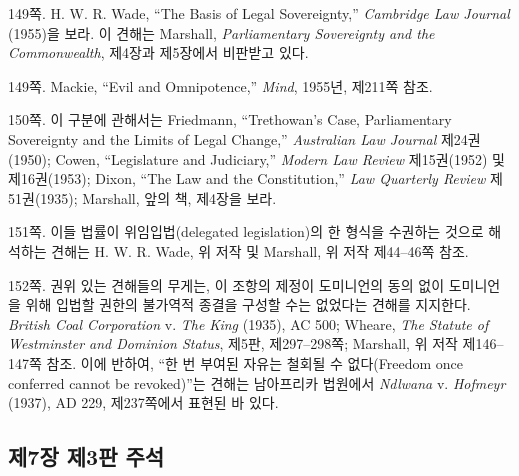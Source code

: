 {\noteentry 149쪽.  H. W. R. Wade, “The Basis of Legal
Sovereignty,” \emph{Cambridge Law Journal} (1955)을 보라. 이 견해는
Marshall, \emph{Parliamentary Sovereignty and the Commonwealth}, 제4장과
제5장에서 비판받고 있다.

\noteentry 149쪽.  Mackie, “Evil and Omnipotence,” \emph{Mind},
1955년, 제211쪽 참조.

\noteentry 150쪽.  이 구분에 관해서는 Friedmann, “Trethowan's
Case, Parliamentary Sovereignty and the Limits of Legal Change,”
\emph{Australian Law Journal} 제24권(1950); Cowen, “Legislature and
Judiciary,” \emph{Modern Law Review} 제15권(1952) 및 제16권(1953);
Dixon, “The Law and the Constitution,” \emph{Law Quarterly Review}
제51권(1935); Marshall, 앞의 책, 제4장을 보라.

\noteentry 151쪽.  이들 법률이 위임입법(delegated legislation)의 한 형식을 수권하는 것으로
해석하는 견해는 H. W. R. Wade, 위 저작 및 Marshall, 위 저작 제44--46쪽
참조.

\noteentry 152쪽.  권위 있는 견해들의 무게는, 이 조항의 제정이 도미니언의 동의 없이
도미니언을 위해 입법할 권한의 불가역적 종결을 구성할 수는 없었다는
견해를 지지한다. \emph{British Coal Corporation} v. \emph{The King}
(1935), AC 500; Wheare, \emph{The Statute of Westminster and Dominion
Status}, 제5판, 제297--298쪽; Marshall, 위 저작 제146--147쪽 참조. 이에
반하여, “한 번 부여된 자유는 철회될 수 없다(Freedom once conferred
cannot be revoked)”는 견해는 남아프리카 법원에서 \emph{Ndlwana} v.
\emph{Hofmeyr} (1937), AD 229, 제237쪽에서 표현된 바 있다.

\subsection{제7장 제3판
주석}\label{uxc81c7uxc7a5-uxc81c3uxd310-uxc8fcuxc11d}

}
